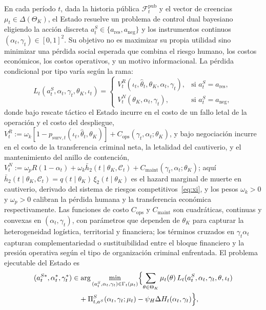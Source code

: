 \documentclass[review,authoryear,12pt]{elsarticle}
\theoremstyle{plain}
\theoremstyle{definition}
\newcommand{\ThetaK}{\Theta_K}
\newcommand{\1}{\mathbf{1}}
\begin{document}
\noindent En cada período $t$, dada la historia pública $\mathcal{F}_t^{\mathrm{pub}}$ y el vector de creencias $\mu_t\in\Delta(\ThetaK)$, el Estado resuelve un problema de control dual bayesiano eligiendo la acción discreta $a_t^S\in\{a_{\mathrm{res}},a_{\mathrm{neg}}\}$ y los instrumentos continuos $(\alpha_t,\gamma_t)\in[0,1]^2$. Su objetivo no es maximizar su propia utilidad sino minimizar una pérdida social esperada que combina el riesgo humano, los costos económicos, los costos operativos, y un motivo informacional. La pérdida condicional por tipo varía según la rama:
\begin{equation}
L_t(a_t^S,\alpha_t,\gamma_t,\theta_K,\iota_t)=\begin{cases}V_t^R(\iota_t,\hat{\theta}_t,\theta_K,\alpha_t,\gamma_t), & \text{si }a_t^S=a_{\mathrm{res}},\\V_t^N(\theta_K,\alpha_t,\gamma_t), & \text{si }a_t^S=a_{\mathrm{neg}},\end{cases}
\label{eq:state-loss}
\end{equation}
donde bajo rescate táctico el Estado incurre en el costo de un fallo letal de la operación y el costo del despliegue, $V_t^R:=\omega_k[1-p_{\mathrm{surv},t}(\iota_t,\hat{\theta}_t,\theta_K)]+C_{\mathrm{ops}}(\gamma_t,\alpha_t;\theta_K)$, y bajo negociación incurre en el costo de la transferencia criminal neta, la letalidad del cautiverio, y el mantenimiento del anillo de contención, $V_t^N:=\omega_pR(1-\alpha_t)+\omega_k \bar h_2(t\mid\theta_K,\mathcal{C}_t)+C_{\mathrm{maint}}(\gamma_t,\alpha_t;\theta_K)$; aquí $\bar h_2(t\mid\theta_K,\mathcal{C}_t)=q(t\mid\theta_K)\,\xi_2(t\mid\theta_K)$ es el hazard marginal de muerte en cautiverio, derivado del sistema de riesgos competitivos~\eqref{eq:xi}, y los pesos $\omega_k>0$ y $\omega_p>0$ calibran la pérdida humana y la transferencia económica respectivamente. Las funciones de costo $C_{\mathrm{ops}}$ y $C_{\mathrm{maint}}$ son cuadráticas, continuas y convexas en $(\alpha_t,\gamma_t)$, con parámetros que dependen de $\theta_K$ para capturar la heterogeneidad logística, territorial y financiera; los términos cruzados en $\gamma_t\alpha_t$ capturan complementariedad o sustituibilidad entre el bloque financiero y la presión operativa según el tipo de organización criminal enfrentada. El problema ejecutable del Estado es
\begin{equation}
\begin{aligned}
(a_t^{S\ast},\alpha_t^\ast,\gamma_t^\ast)&\in\arg\min_{(a_t^S,\alpha_t,\gamma_t)\in\Gamma_t(\mu_t)}\Bigl\{\sum_{\theta\in\ThetaK}\mu_t(\theta)\,L_t(a_t^S,\alpha_t,\gamma_t,\theta,\iota_t)\\
&\quad+\Pi_{t,a^S}^S(\alpha_t,\gamma_t;\mu_t)-\psi_H\Delta H_t(\alpha_t,\gamma_t)\Bigr\},
\end{aligned}
\label{eq:state-dual-control}
\end{equation}
\end{document}
